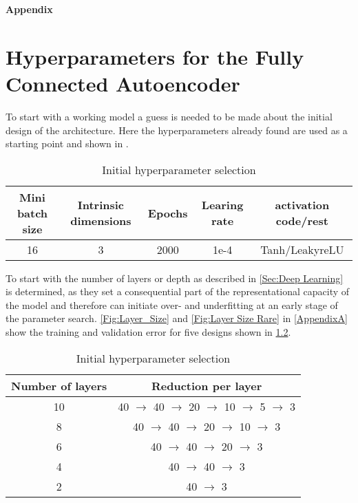 

\begin{center}
	{\sffamily \bfseries\Large Appendix}\\
\end{center}%
\vspace{1cm}

\chapter{Hyperparameters for the Fully Connected Autoencoder}
\label{Ch:ApA}


To start with a working model a guess is needed to be made about the initial design of the architecture. Here the hyperparameters already found are used as a starting point and shown in .\\
\begin{table}[!htbp]\centering
	\begin{tabular}{ |c|c|c|c|c| }
		\hline
		Mini batch size & Intrinsic dimensions& Epochs & Learing rate & activation code/rest\\ [.5ex]
		\hline
		16 & 3 & 2000& 1e-4 & Tanh/LeakyreLU\\ \hline
	\end{tabular}
	\caption{Initial hyperparameter selection}
	\label{Tab:First Guess}
\end{table}
To start with the number of layers or depth as described in \cref{Sec:Deep Learning} is determined, as they set a consequential part of the representational capacity of the model and therefore can initiate over- and underfitting at an early stage of the parameter search. \cref{Fig:Layer_Size} and \cref{Fig:Layer Size Rare} in \cref{AppendixA} show the training and validation error for five designs shown in \cref{Tab:Layer Size}.\\
\begin{table}[!htbp]\centering
	\begin{tabular}{ |c|c| }
		\hline
		Number of layers & Reduction per layer \\ [.5ex]
		\hline
		10 & 40 \(\rightarrow\) 40 \(\rightarrow\) 20  \(\rightarrow\) 10 \(\rightarrow\) 5 \(\rightarrow\) 3\\ \hline
		8 & 40 \(\rightarrow\) 40 \(\rightarrow\) 20  \(\rightarrow\) 10 \(\rightarrow\) 3\\ \hline
		6 & 40 \(\rightarrow\) 40 \(\rightarrow\) 20  \(\rightarrow\) 3\\ \hline
		4 & 40 \(\rightarrow\) 40 \(\rightarrow\) 3\\ \hline
		2 & 40 \(\rightarrow\) 3\\ \hline
	\end{tabular}
	\caption{Initial hyperparameter selection}
	\label{Tab:Layer Size}
\end{table}
